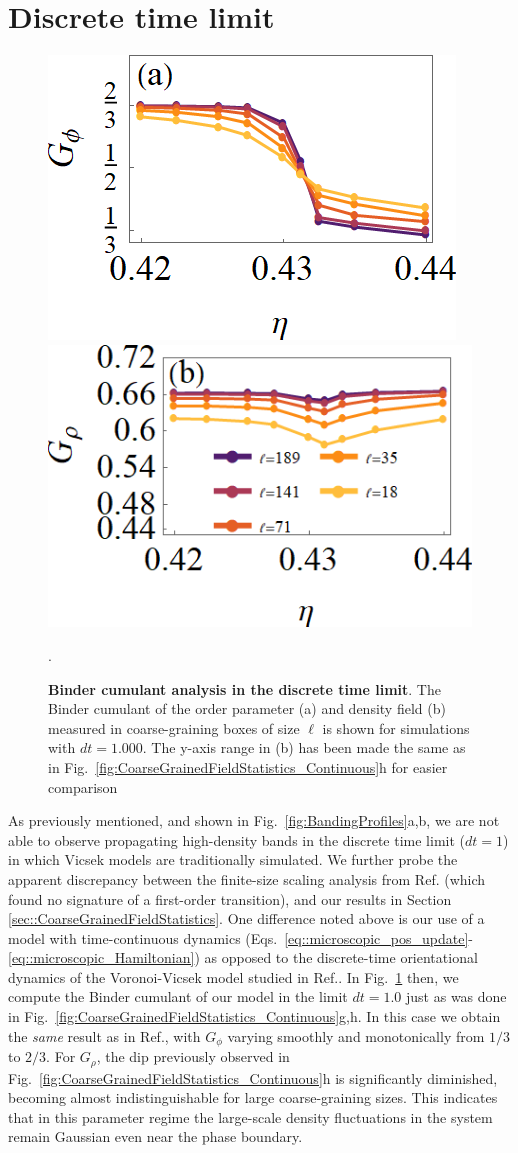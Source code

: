 \documentclass[twoside,twocolumn,9pt]{article}
\begin{document}
\section{Discrete time limit}
\label{sec:discreteTime}

\begin{figure}[b]
	\centering
	\includegraphics[width=0.470\columnwidth]{G_phi_dt=1.000.png}
	\includegraphics[width=0.510\columnwidth]{G_rho_dt=1.000.png}
	\caption{\textbf{Binder cumulant analysis in the discrete time limit}.
		The Binder cumulant of the order parameter (a) and density field (b) measured in coarse-graining boxes of size $\ell$ is shown for simulations with $dt=1.000$.
		The y-axis range in (b) has been made the same as in  Fig.~\ref{fig:CoarseGrainedFieldStatistics_Continuous}h for easier comparison}.
	\label{fig:CoarseGrainedFieldStatistics_Discrete}
\end{figure}

As previously mentioned, and shown in Fig.~\ref{fig:BandingProfiles}a,b, we are not able to observe propagating high-density bands in the discrete time limit ($dt = 1$) in which Vicsek models are traditionally simulated.
We further probe the apparent discrepancy between the finite-size scaling analysis from Ref.\cite{ginelli2010relevance} (which found no signature of a first-order transition), and our results in Section \ref{sec::CoarseGrainedFieldStatistics}.
One difference noted above is our use of a model with time-continuous dynamics (Eqs.~\ref{eq::microscopic_pos_update}-\ref{eq::microscopic_Hamiltonian}) as opposed to the discrete-time orientational dynamics of the Voronoi-Vicsek model studied in Ref.\cite{ginelli2010relevance}.
In Fig.~\ref{fig:CoarseGrainedFieldStatistics_Discrete} then, we compute the Binder cumulant of our model in the limit $dt=1.0$ just as was done in Fig.~\ref{fig:CoarseGrainedFieldStatistics_Continuous}g,h.
In this case we obtain the \emph{same} result as in Ref.\cite{ginelli2010relevance}, with $G_{\phi}$ varying smoothly and monotonically from $1/3$ to $2/3$.
For $G_{\rho}$, the dip previously observed in Fig.~\ref{fig:CoarseGrainedFieldStatistics_Continuous}h is significantly diminished, becoming almost indistinguishable for large coarse-graining sizes.
This indicates that in this parameter regime the large-scale density fluctuations in the system remain Gaussian even near the phase boundary.
\end{document}
